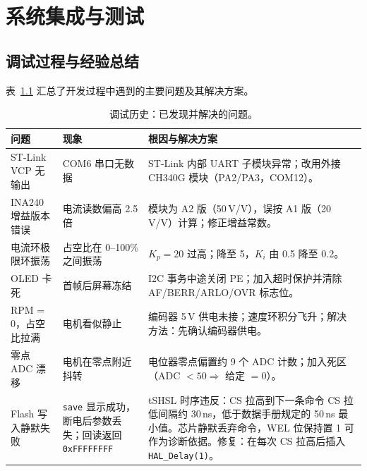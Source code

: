 \documentclass[12pt, a4paper]{ctexrep}
\begin{document}
\chapter{系统集成与测试}

\section{调试过程与经验总结}

表~\ref{tab:issues} 汇总了开发过程中遇到的主要问题及其解决方案。

\begin{table}[H]
    \centering
    \caption{调试历史：已发现并解决的问题。}
    \label{tab:issues}
    \begin{tabular}{p{2.8cm}p{4cm}p{5.7cm}}
        \toprule
        \textbf{问题} & \textbf{现象} & \textbf{根因与解决方案} \\
        \midrule
        ST-Link VCP 无输出 &
            COM6 串口无数据 &
            ST-Link 内部 UART 子模块异常；改用外接 CH340G 模块（PA2/PA3，COM12）。 \\
        \addlinespace
        INA240 增益版本错误 &
            电流读数偏高 2.5 倍 &
            模块为 A2 版（50\,V/V），误按 A1 版（20\,V/V）计算；修正增益常数。 \\
        \addlinespace
        电流环极限环振荡 &
            占空比在 0--100\% 之间振荡 &
            $K_p=20$ 过高；降至 5，$K_i$ 由 0.5 降至 0.2。 \\
        \addlinespace
        OLED 卡死 &
            首帧后屏幕冻结 &
            I2C 事务中途关闭 PE；加入超时保护并清除 AF/BERR/ARLO/OVR 标志位。 \\
        \addlinespace
        RPM = 0，占空比拉满 &
            电机看似静止 &
            编码器 5\,V 供电未接；速度环积分飞升；解决方法：先确认编码器供电。 \\
        \addlinespace
        零点 ADC 漂移 &
            电机在零点附近抖转 &
            电位器零点偏置约 9 个 ADC 计数；加入死区（ADC $<50 \Rightarrow$ 给定 $=0$）。 \\
        \addlinespace
        Flash 写入静默失败 &
            \texttt{save} 显示成功，断电后参数丢失；回读返回 \texttt{0xFFFFFFFF} &
            tSHSL 时序违反：CS 拉高到下一条命令 CS 拉低间隔约 30\,ns，低于数据手册规定的 50\,ns 最小值。芯片静默丢弃命令，WEL 位保持置 1 可作为诊断依据。修复：在每次 CS 拉高后插入 \texttt{HAL\_Delay(1)}。 \\
        \bottomrule
    \end{tabular}
\end{table}
\end{document}

